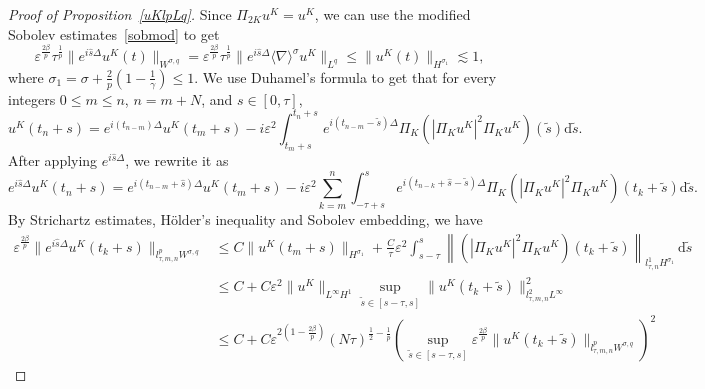 \documentclass[10pt,a4paper]{article}
\begin{document}
  \begin{proof}[Proof of Proposition~\ref{uKlpLq}]

    Since \(\Pi_{2K} u^K = u^K\), we can use the modified Sobolev
    estimates~\eqref{sobmod} to get 
    \begin{equation}\label{l0usq}
      \varepsilon^{\frac{2\beta}p}\tau^\frac1p \|e^{i\hat s\Delta}u^K(t)\|_{W^{\sigma,q}} = 
      \varepsilon^{\frac{2\beta}p} \tau^\frac1p \|e^{i\hat s\Delta}\langle\nabla\rangle^\sigma u^K\|_{L^q}
      \leq \|u^K(t)\|_{H^{\sigma_1}} \lesssim 1,
    \end{equation}
    where \(\sigma_1 = \sigma + \frac2p(1-\frac1\gamma) \leq 1\). We use
    Duhamel's formula to get that for every integers \(0 \leq m \leq n \), 
    \(n = m + N\), and \(s \in [0, \tau]\), 
    \[ u^K(t_n+s) = e^{i(t_{n-m})\Delta} u^K(t_m+s) - i\varepsilon^2 
    \int_{t_m+s}^{t_n+s} e^{i(t_{n-m}-\tilde{s})\Delta}\Pi_K
    \left(|\Pi_K u^K|^2 \Pi_K u^K\right) (\tilde{s}) \mathrm{d} \tilde{s}. \]
    After applying \(e^{i\hat s\Delta}\), we rewrite it as 
    \begin{equation}\label{Duhamel}
      e^{i\hat s\Delta}u^K(t_n+s) = e^{i(t_{n-m}+\hat{s})\Delta} u^K(t_m+s) - i\varepsilon^2 
      \sum_{k=m}^{n} \int_{-\tau+s}^{s} e^{i(t_{n-k}+\hat{s}-\tilde{s})\Delta}\Pi_K
      \left(|\Pi_K u^K|^2 \Pi_K u^K\right) (t_k+\tilde{s}) \mathrm{d} \tilde{s}.
    \end{equation}
    By Strichartz estimates, H\"older's inequality and Sobolev embedding, we have 
    \begin{equation}\label{ulpWsq1}
      \begin{aligned}
        \varepsilon^{\frac{2\beta}p}\|e^{i\hat s\Delta}u^K(t_k+s)\|_{l^p_{\tau,m,n}W^{\sigma,q}} 
        & \leq C \|u^K(t_m+s)\|_{H^{\sigma_1}} + \frac{C}\tau
        \varepsilon^2 \int_{s-\tau}^s \left\|\left(|\Pi_K u^K|^2 \Pi_K u^K\right) 
        (t_k+\tilde{s})\right\|_{l^1_{\tau,n}H^{\sigma_1}}\,\mathrm{d}\tilde{s} \\
        & \leq C + C \varepsilon^2 \|u^K\|_{L^\infty H^1} \sup_{\tilde{s} \in [s-\tau,s]} 
        \|u^K(t_k+\tilde{s})\|_{l^2_{\tau,m,n}L^\infty}^2  \\
        & \leq C + C \varepsilon^{2(1-\frac{2\beta}p)} (N\tau)^{\frac12-\frac1p}
        \left( \sup_{\tilde{s} \in [s-\tau,s]} \varepsilon^{\frac{2\beta}p}
        \|u^K(t_k+\tilde{s})\|_{l^p_{\tau,m,n}W^{\sigma,q}}\right)^2 
      \end{aligned}
    \end{equation}

\end{proof}
\end{document}
